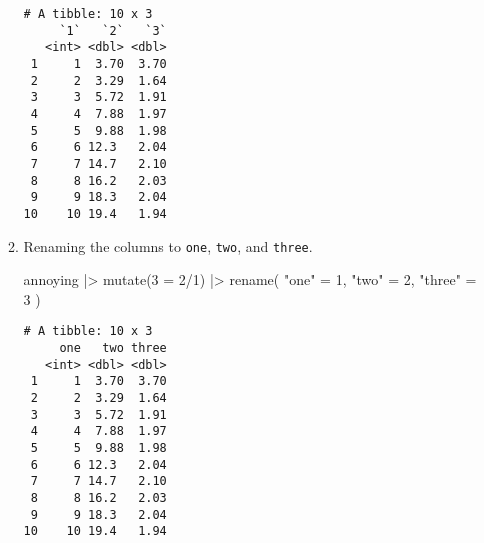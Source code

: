 \documentclass[
  letterpaper,
  DIV=11,
  numbers=noendperiod]{scrreprt}
\newenvironment{Shaded}{\begin{snugshade}}{\end{snugshade}}
\newcommand{\AttributeTok}[1]{\textcolor[rgb]{0.40,0.45,0.13}{#1}}
\newcommand{\FunctionTok}[1]{\textcolor[rgb]{0.28,0.35,0.67}{#1}}
\newcommand{\NormalTok}[1]{\textcolor[rgb]{0.00,0.23,0.31}{#1}}
\newcommand{\OtherTok}[1]{\textcolor[rgb]{0.00,0.23,0.31}{#1}}
\newcommand{\SpecialCharTok}[1]{\textcolor[rgb]{0.37,0.37,0.37}{#1}}
\newcommand{\StringTok}[1]{\textcolor[rgb]{0.13,0.47,0.30}{#1}}
\begin{document}
\begin{enumerate}
\begin{enumerate}
\begin{tcolorbox}
\begin{verbatim}
# A tibble: 10 x 3
     `1`   `2`   `3`
   <int> <dbl> <dbl>
 1     1  3.70  3.70
 2     2  3.29  1.64
 3     3  5.72  1.91
 4     4  7.88  1.97
 5     5  9.88  1.98
 6     6 12.3   2.04
 7     7 14.7   2.10
 8     8 16.2   2.03
 9     9 18.3   2.04
10    10 19.4   1.94
\end{verbatim}

    \end{tcolorbox}
  \item
    Renaming the columns to \texttt{one}, \texttt{two}, and
    \texttt{three}.

    \begin{tcolorbox}[enhanced jigsaw, left=2mm, rightrule=.15mm, bottomtitle=1mm, opacitybacktitle=0.6, leftrule=.75mm, opacityback=0, colframe=quarto-callout-note-color-frame, bottomrule=.15mm, coltitle=black, toptitle=1mm, colback=white, titlerule=0mm, colbacktitle=quarto-callout-note-color!10!white, title={Answer}, toprule=.15mm, breakable, arc=.35mm]

\begin{Shaded}
\begin{Highlighting}[]
\NormalTok{annoying }\SpecialCharTok{|\textgreater{}} 
  \FunctionTok{mutate}\NormalTok{(}\StringTok{\textasciigrave{}}\AttributeTok{3}\StringTok{\textasciigrave{}} \OtherTok{=} \StringTok{\textasciigrave{}}\AttributeTok{2}\StringTok{\textasciigrave{}}\SpecialCharTok{/}\StringTok{\textasciigrave{}}\AttributeTok{1}\StringTok{\textasciigrave{}}\NormalTok{) }\SpecialCharTok{|\textgreater{}} 
    \FunctionTok{rename}\NormalTok{(}
    \StringTok{"one"} \OtherTok{=} \StringTok{\textasciigrave{}}\AttributeTok{1}\StringTok{\textasciigrave{}}\NormalTok{,}
    \StringTok{"two"} \OtherTok{=} \StringTok{\textasciigrave{}}\AttributeTok{2}\StringTok{\textasciigrave{}}\NormalTok{,}
    \StringTok{"three"} \OtherTok{=} \StringTok{\textasciigrave{}}\AttributeTok{3}\StringTok{\textasciigrave{}}
\NormalTok{    )}
\end{Highlighting}
\end{Shaded}

\begin{verbatim}
# A tibble: 10 x 3
     one   two three
   <int> <dbl> <dbl>
 1     1  3.70  3.70
 2     2  3.29  1.64
 3     3  5.72  1.91
 4     4  7.88  1.97
 5     5  9.88  1.98
 6     6 12.3   2.04
 7     7 14.7   2.10
 8     8 16.2   2.03
 9     9 18.3   2.04
10    10 19.4   1.94
\end{verbatim}

    \end{tcolorbox}
  \end{enumerate}
\end{enumerate}
\end{document}

